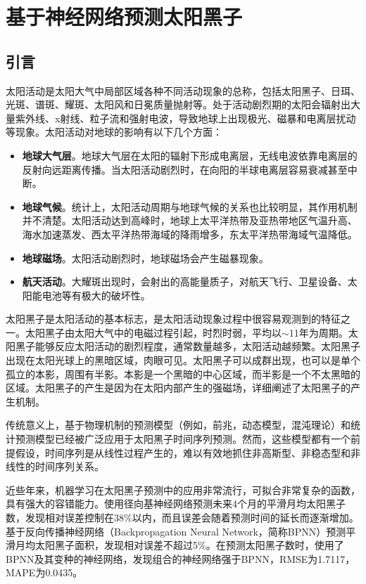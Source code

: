 \chapter{基于神经网络预测太阳黑子}\label{chap:ml_sunspot}

\section{引言}\label{sec:ss_intro}

太阳活动是太阳大气中局部区域各种不同活动现象的总称，包括太阳黑子、日珥、光斑、谱斑、耀斑、太阳风和日冕质量抛射等。处于活动剧烈期的太阳会辐射出大量紫外线、x射线、粒子流和强射电波，导致地球上出现极光、磁暴和电离层扰动等现象。太阳活动对地球的影响有以下几个方面\citep{jie2012prediction}：
\begin{itemize}
  \item \textbf{地球大气层}。地球大气层在太阳的辐射下形成电离层，无线电波依靠电离层的反射向远距离传播。当太阳活动剧烈时，在向阳的半球电离层容易衰减甚至中断。
  \item \textbf{地球气候}。统计上，太阳活动周期与地球气候的关系也比较明显，其作用机制并不清楚。太阳活动达到高峰时，地球上太平洋热带及亚热带地区气温升高、海水加速蒸发、西太平洋热带海域的降雨增多，东太平洋热带海域气温降低。
  \item \textbf{地球磁场}。太阳活动剧烈时，地球磁场会产生磁暴现象。
  \item \textbf{航天活动}。大耀斑出现时，会射出的高能量质子，对航天飞行、卫星设备、太阳能电池等有极大的破坏性。
\end{itemize}

太阳黑子是太阳活动的基本标志，是太阳活动现象过程中很容易观测到的特征之一。太阳黑子由太阳大气中的电磁过程引起，时烈时弱，平均以$\sim$11年为周期。太阳黑子能够反应太阳活动的剧烈程度，通常数量越多，太阳活动越频繁。太阳黑子出现在太阳光球上的黑暗区域，肉眼可见。太阳黑子可以成群出现，也可以是单个孤立的本影，周围有半影。本影是一个黑暗的中心区域，而半影是一个不太黑暗的区域。太阳黑子的产生是因为在太阳内部产生的强磁场，\citet{noyes2013sun}详细阐述了太阳黑子的产生机制。

传统意义上，基于物理机制的预测模型（例如，前兆，动态模型，混沌理论\citep{jie2012prediction}）和统计预测模型已经被广泛应用于太阳黑子时间序列预测。然而，这些模型都有一个前提假设，时间序列是从线性过程产生的，难以有效地抓住非高斯型、非稳态型和非线性的时间序列关系\citep{jiang2011sunspot,arlt2015solar}。

近些年来，机器学习在太阳黑子预测中的应用非常流行\citep{pala2019forecasting}，可拟合非常复杂的函数，具有强大的容错能力。\citet{zhao2008prediction}使用径向基神经网络预测未来4个月的平滑月均太阳黑子数，发现相对误差控制在38\%以内，而且误差会随着预测时间的延长而逐渐增加。\citet{ding2012prediction}基于反向传播神经网络（Backpropagation Neural Network，简称BPNN）预测平滑月均太阳黑子面积，发现相对误差不超过5\%。\citet{li2018hybrid}在预测太阳黑子数时，使用了BPNN及其变种的神经网络，发现组合的神经网络强于BPNN，RMSE为1.7117，MAPE为0.0435。

